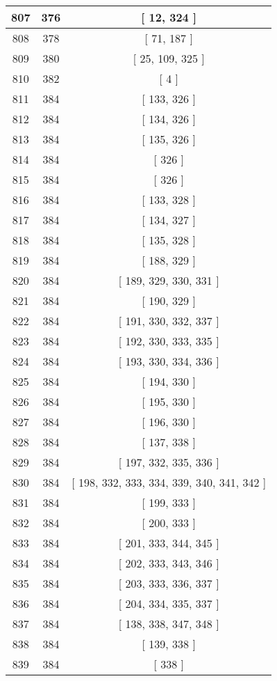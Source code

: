 \begin{center}
\begin{longtable}[H]{|| c c c ||}
\hline
807 & 376 & [ 12, 324 ] \\ 
\hline
808 & 378 & [ 71, 187 ] \\ 
\hline
809 & 380 & [ 25, 109, 325 ] \\ 
\hline
810 & 382 & [ 4 ] \\ 
\hline
811 & 384 & [ 133, 326 ] \\ 
\hline
812 & 384 & [ 134, 326 ] \\ 
\hline
813 & 384 & [ 135, 326 ] \\ 
\hline
814 & 384 & [ 326 ] \\ 
\hline
815 & 384 & [ 326 ] \\ 
\hline
816 & 384 & [ 133, 328 ] \\ 
\hline
817 & 384 & [ 134, 327 ] \\ 
\hline
818 & 384 & [ 135, 328 ] \\ 
\hline
819 & 384 & [ 188, 329 ] \\ 
\hline
820 & 384 & [ 189, 329, 330, 331 ] \\ 
\hline
821 & 384 & [ 190, 329 ] \\ 
\hline
822 & 384 & [ 191, 330, 332, 337 ] \\ 
\hline
823 & 384 & [ 192, 330, 333, 335 ] \\ 
\hline
824 & 384 & [ 193, 330, 334, 336 ] \\ 
\hline
825 & 384 & [ 194, 330 ] \\ 
\hline
826 & 384 & [ 195, 330 ] \\ 
\hline
827 & 384 & [ 196, 330 ] \\ 
\hline
828 & 384 & [ 137, 338 ] \\ 
\hline
829 & 384 & [ 197, 332, 335, 336 ] \\ 
\hline
830 & 384 & [ 198, 332, 333, 334, 339, 340, 341, 342 ] \\ 
\hline
831 & 384 & [ 199, 333 ] \\ 
\hline
832 & 384 & [ 200, 333 ] \\ 
\hline
833 & 384 & [ 201, 333, 344, 345 ] \\ 
\hline
834 & 384 & [ 202, 333, 343, 346 ] \\ 
\hline
835 & 384 & [ 203, 333, 336, 337 ] \\ 
\hline
836 & 384 & [ 204, 334, 335, 337 ] \\ 
\hline
837 & 384 & [ 138, 338, 347, 348 ] \\ 
\hline
838 & 384 & [ 139, 338 ] \\ 
\hline
839 & 384 & [ 338 ] \\ 

\end{longtable}
\end{center}
